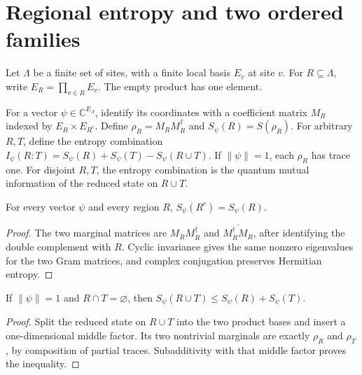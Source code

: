 \section{Regional entropy and two ordered families}

Let $\Lambda$ be a finite set of sites, with a finite local basis $E_v$ at
site $v$. For $R\subseteq\Lambda$, write $E_R=\prod_{v\in R}E_v$.
The empty product has one element.

\begin{definition}
    \label{def:finite_product_regional_entropy}
    \leanok
    For a vector $\psi\in\mathbb C^{E_\Lambda}$, identify its coordinates with
    a coefficient matrix $M_R$ indexed by $E_R\times E_{R^c}$. Define
    $\rho_R=M_RM_R^\dagger$ and $S_\psi(R)=S(\rho_R)$.
    For arbitrary $R,T$, define the entropy combination
    $I_\psi(R:T)=S_\psi(R)+S_\psi(T)-S_\psi(R\cup T)$.
    If $\|\psi\|=1$, each $\rho_R$ has trace one. For disjoint $R,T$,
    the entropy combination is the quantum mutual information of the reduced
    state on $R\cup T$.
\end{definition}

\begin{theorem}
    \label{thm:finite_product_entropy_complement}
    \leanok
    For every vector $\psi$ and every region $R$,
    $S_\psi(R^c)=S_\psi(R)$.
\end{theorem}
\begin{proof}\leanok
    The two marginal matrices are $M_RM_R^\dagger$ and
    $\overline{M_R^\dagger M_R}$, after identifying the double complement
    with $R$. Cyclic invariance gives the same nonzero eigenvalues for the
    two Gram matrices, and complex conjugation preserves Hermitian entropy.
\end{proof}

\begin{theorem}
    \label{thm:finite_product_entropy_subadditivity}
    \leanok
    If $\|\psi\|=1$ and $R\cap T=\varnothing$, then
    $S_\psi(R\cup T)\le S_\psi(R)+S_\psi(T)$.
\end{theorem}
\begin{proof}\leanok
    Split the reduced state on $R\cup T$ into the two product bases and
    insert a one-dimensional middle factor. Its two nontrivial marginals
    are exactly $\rho_R$ and $\rho_T$, by composition of partial traces.
    Subadditivity with that middle factor proves the inequality.
\end{proof}

